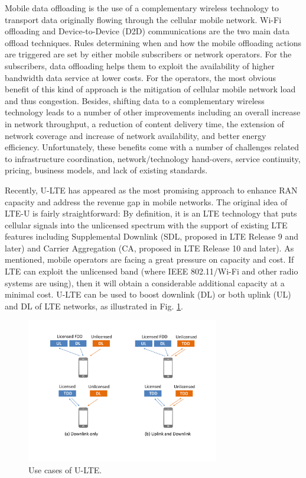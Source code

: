 Mobile data offloading is the use of a complementary wireless technology to transport data originally flowing through the cellular mobile network. \mbox{Wi-Fi} offloading and Device-to-Device (D2D) communications are the two main data offload techniques. Rules determining when and how the mobile offloading actions are triggered are set by either mobile subscribers or network operators. For the subscribers, data offloading helps them to exploit the availability of higher bandwidth data service at lower costs. For the operators, the most obvious benefit of this kind of approach is the mitigation of cellular mobile network load and thus congestion. Besides, shifting data to a complementary wireless technology leads to a number of other improvements including an overall increase in network throughput, a reduction of content delivery time, the extension of network coverage and increase of network availability, and better energy efficiency. Unfortunately, these benefits come with a number of challenges related to infrastructure coordination, network/technology hand-overs, service continuity, pricing, business models, and lack of existing standards. 

Recently, \mbox{U-LTE} has appeared as the most promising approach to enhance RAN capacity and address the revenue gap in mobile networks. The original idea of \mbox{LTE-U} is fairly straightforward: By definition, it is an LTE technology that puts cellular signals into the unlicensed spectrum with the support of existing LTE features including Supplemental Downlink (SDL, proposed in LTE Release 9 and later) and Carrier Aggregation (CA, proposed in LTE Release 10 and later).  As mentioned, mobile operators are facing a great pressure on capacity and cost. If LTE can exploit the unlicensed band (where IEEE 802.11/\mbox{Wi-Fi} and other radio systems are using), then it will obtain a considerable additional capacity at a minimal cost. \mbox{U-LTE} can be used to boost downlink (DL) or both uplink (UL) and DL of LTE networks, as illustrated in Fig. \ref{figs:U-LTE-use_model}.
\begin{figure}[!ht]
	\centering
	\includegraphics[width=0.75\textwidth]{figs/U-LTE-use_model}
	\caption{Use cases of U-LTE.}
	\label{figs:U-LTE-use_model}
\end{figure}

